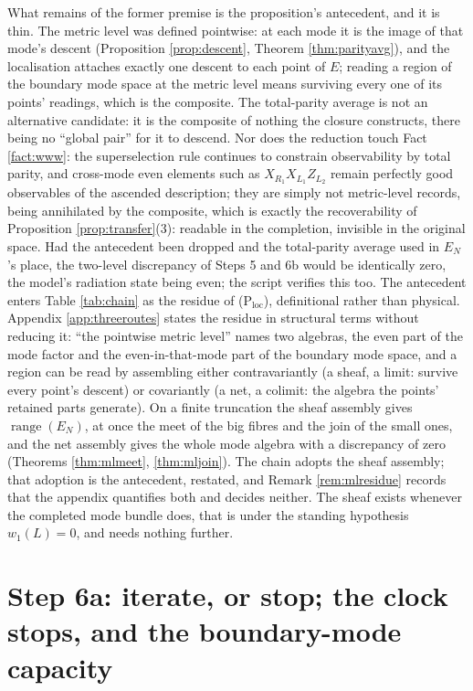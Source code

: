 \documentclass[11pt]{article}
\theoremstyle{definition}
\newcommand{\shL}{L}
\newcommand{\EN}{E_{N}}
\begin{document}
What remains of the former premise is the proposition's antecedent, and it is thin. The metric level was defined pointwise: at each mode it is the image of that mode's descent (Proposition \ref{prop:descent}, Theorem \ref{thm:parityavg}), and the localisation attaches exactly one descent to each point of $E$; reading a region of the boundary mode space at the metric level means surviving every one of its points' readings, which is the composite. The total-parity average is not an alternative candidate: it is the composite of nothing the closure constructs, there being no ``global pair'' for it to descend. Nor does the reduction touch Fact \ref{fact:www}: the superselection rule continues to constrain observability by total parity, and cross-mode even elements such as $X_{R_1}X_{L_1}Z_{L_2}$ remain perfectly good observables of the ascended description; they are simply not metric-level records, being annihilated by the composite, which is exactly the recoverability of Proposition \ref{prop:transfer}(3): readable in the completion, invisible in the original space. Had the antecedent been dropped and the total-parity average used in $\EN$'s place, the two-level discrepancy of Steps 5 and 6b would be identically zero, the model's radiation state being even; the script verifies this too. The antecedent enters Table \ref{tab:chain} as the residue of (P$_{\mathrm{loc}}$), definitional rather than physical. Appendix \ref{app:threeroutes} states the residue in structural terms without reducing it: ``the pointwise metric level'' names two algebras, the even part of the mode factor and the even-in-that-mode part of the boundary mode space, and a region can be read by assembling either contravariantly (a sheaf, a limit: survive every point's descent) or covariantly (a net, a colimit: the algebra the points' retained parts generate). On a finite truncation the sheaf assembly gives $\operatorname{range}(\EN)$, at once the meet of the big fibres and the join of the small ones, and the net assembly gives the whole mode algebra with a discrepancy of zero (Theorems \ref{thm:mlmeet}, \ref{thm:mljoin}). The chain adopts the sheaf assembly; that adoption is the antecedent, restated, and Remark \ref{rem:mlresidue} records that the appendix quantifies both and decides neither. The sheaf exists whenever the completed mode bundle does, that is under the standing hypothesis $w_1(\shL) = 0$, and needs nothing further.

\section{Step 6a: iterate, or stop; the clock stops, and the boundary-mode capacity}\label{sec:capacity}
\end{document}
